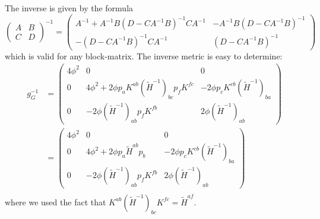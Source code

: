 The inverse is given by the formula
\begin{equation*}
	\begin{pmatrix}
		A & B\\
		C & D
	\end{pmatrix}^{-1}
	=
	\begin{pmatrix}
		A^{-1}+A^{-1}B(D-CA^{-1}B)^{-1}CA^{-1} & -A^{-1}B (D-CA^{-1}B)^{-1}\\
		-(D-CA^{-1}B)^{-1}CA^{-1} & (D-CA^{-1}B)^{-1}
	\end{pmatrix}
\end{equation*}
which is valid for any block-matrix. The inverse metric is easy to determine:
\begin{align*}
	g^{-1}_G&=
	\begin{pmatrix}
		4\phi^2 & 0 & 0 \\
		0& 4\phi^2+2\phi p_a K^{ab}(\tilde H^{-1})_{bc}p_f K^{fc} & -2\phi p_c K^{cb}(\tilde H^{-1})_{ba} \\
		0& -2\phi (\tilde H^{-1})_{ab}p_f K^{fb} & 2\phi (\tilde H^{-1})_{ab}
	\end{pmatrix}\\
	&=
	\begin{pmatrix}
		4\phi^2 & 0 & 0\\
		0 & 4\phi^2+2\phi p_a \tilde H^{ab} p_b & -2\phi p_c K^{cb}(\tilde H^{-1})_{ba} \\
		0 & -2\phi (\tilde H^{-1})_{ab}p_f K^{fb} & 2\phi (\tilde H^{-1})_{ab}
	\end{pmatrix}\\
\end{align*}
where we used the fact that $K^{ab}(\tilde H^{-1})_{bc}K^{fc}=\tilde H^{af}$.
%
